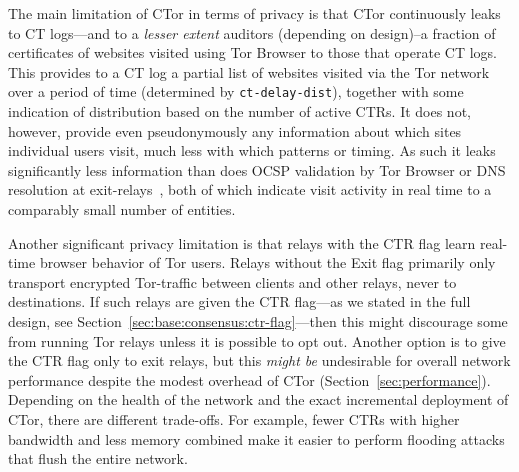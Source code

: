 The main limitation of CTor in terms of privacy is that CTor continuously leaks
to CT logs---and to a \emph{lesser extent} auditors (depending on design)--a
fraction of certificates of websites visited using Tor Browser to those that operate CT
logs. This provides to a CT log a partial list of websites visited via the Tor
network over a period of time (determined by \texttt{ct-delay-dist}), together
with some indication of distribution based on the number of active CTRs. It does
not, however, provide even pseudonymously any information about which sites
individual users visit, much less with which patterns or timing. As such it
leaks significantly less information than does OCSP validation by Tor Browser or DNS
resolution at exit-relays~\cite{TorDNS}, both of which indicate visit activity
in real time to a comparably small number of entities.

Another significant privacy limitation is that relays with the CTR flag learn
real-time browser behavior of Tor users. Relays without the Exit flag primarily
only transport encrypted Tor-traffic between clients and other relays, never to
destinations. If such relays are given the CTR flag---as we stated in the full
design, see Section~\ref{sec:base:consensus:ctr-flag}---then this might
discourage some from running Tor relays unless it is possible to opt out.
Another option is to give the CTR flag only to exit relays, but this \emph{might
be} undesirable for overall network performance despite the modest overhead of
CTor (Section~\ref{sec:performance}). Depending on the health of the network
and the exact incremental deployment of CTor, there are different trade-offs.
For example, fewer CTRs with higher bandwidth and less memory combined make it
easier to perform flooding attacks that flush the entire network.
